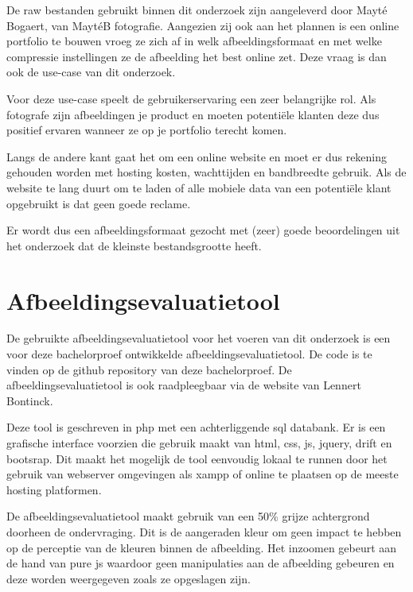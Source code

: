De \gls{raw} bestanden gebruikt binnen dit onderzoek zijn aangeleverd door Mayté Bogaert, van MaytéB fotografie. Aangezien zij ook aan het plannen is een online portfolio te bouwen vroeg ze zich af in welk \gls{afbeeldingsformaat} en met welke compressie instellingen ze de afbeelding het best online zet. Deze vraag is dan ook de \gls{use-case} van dit onderzoek.

Voor deze \gls{use-case} speelt de gebruikerservaring een zeer belangrijke rol. Als fotografe zijn afbeeldingen je product en moeten potentiële klanten deze dus positief ervaren wanneer ze op je portfolio terecht komen.

Langs de andere kant gaat het om een online website en moet er dus rekening gehouden worden met \gls{hosting} kosten, wachttijden en \gls{bandbreedte} gebruik. Als de website te lang duurt om te laden of alle mobiele data van een potentiële klant opgebruikt is dat geen goede reclame.

Er wordt dus een \gls{afbeeldingsformaat} gezocht met (zeer) goede beoordelingen uit het onderzoek dat de kleinste bestandsgrootte heeft.

\section{Afbeeldingsevaluatietool}
\label{sec:onderzoek-evaluatietool}

De gebruikte \gls{afbeeldingsevaluatietool} voor het voeren van dit onderzoek is een voor deze bachelorproef ontwikkelde \gls{afbeeldingsevaluatietool}. De code is te vinden op de \gls{github} repository van deze bachelorproef. De \gls{afbeeldingsevaluatietool} is ook raadpleegbaar via de website van Lennert Bontinck.

Deze tool is geschreven in \gls{php} met een achterliggende \gls{sql} databank. Er is een grafische interface voorzien die gebruik maakt van \gls{html}, \gls{css}, \gls{js}, \gls{jquery}, \gls{drift} en \gls{bootsrap}. Dit maakt het mogelijk de tool eenvoudig lokaal te runnen door het gebruik van webserver omgevingen als \gls{xampp} of online te plaatsen op de meeste \gls{hosting} platformen.

De \gls{afbeeldingsevaluatietool} maakt gebruik van een 50\% grijze achtergrond doorheen de ondervraging. Dit is de aangeraden kleur om geen impact te hebben op de perceptie van de kleuren binnen de afbeelding. Het inzoomen gebeurt aan de hand van pure \gls{js} waardoor geen manipulaties aan de afbeelding gebeuren en deze worden weergegeven zoals ze opgeslagen zijn. 

